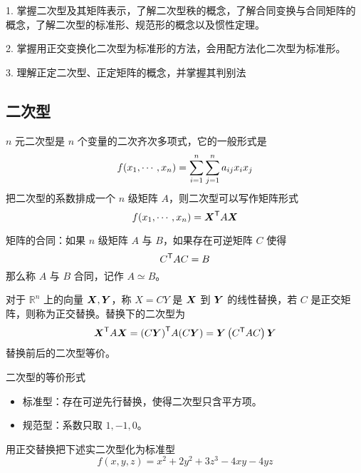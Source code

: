1. 掌握二次型及其矩阵表示，了解二次型秩的概念，了解合同变换与合同矩阵的概念，了解二次型的标准形、规范形的概念以及惯性定理。

2. 掌握用正交变换化二次型为标准形的方法，会用配方法化二次型为标准形。

3. 理解正定二次型、正定矩阵的概念，并掌握其判别法

\subsection{二次型}

\newcommand{\XAX}{\transpose{\vbf{X}}A\vbf{X}}

\begin{definition}[二次型]
	$n$ 元二次型是 $n$ 个变量的二次齐次多项式，它的一般形式是
	\[f(x_1,\cdots,x_n) = \sum_{i=1}^n\sum_{j=1}^na_{ij}x_ix_j\]
	把二次型的系数排成一个 $n$ 级矩阵 $A$，则二次型可以写作矩阵形式
	\[f(\seq{x}{n}) = \XAX\]
\end{definition}

矩阵的合同：如果 $n$ 级矩阵 $A$ 与 $B$，如果存在可逆矩阵 $C$ 使得
\[ {C}^\mathsf{T}AC = B \]
那么称 $A$ 与 $B$ 合同，记作 $A\simeq B$。

对于 $\mathbb{R}^n$ 上的向量 $\boldsymbol{X}, \boldsymbol{Y}$，称 $X = CY$ 是 $\boldsymbol{X}$ 到 $\boldsymbol{Y}$ 的线性替换，若 $C$ 是正交矩阵，则称为正交替换。替换下的二次型为
\[ \XAX = \transpose{(C\vbf{Y})} A (C\vbf{Y}) = \vbf{Y}\left(\transpose{C} A C\right)\vbf{Y} \]
替换前后的二次型等价。

二次型的等价形式
\begin{itemize}
	\item 标准型：存在可逆先行替换，使得二次型只含平方项。
	\item 规范型：系数只取 $1,-1,0$。
\end{itemize}

\begin{example}
	用正交替换把下述实二次型化为标准型
	\[ f(x, y, z) = x^2 + 2y^2 + 3z^3 - 4xy - 4yz \]
\end{example}

